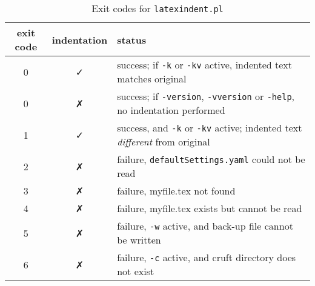  \begin{table}[!htb]
  \caption{Exit codes for \texttt{latexindent.pl}}
  \label{tab:exit-codes}
  \begin{tabular}{ccl}
   \toprule
   exit code & indentation & status                                                                                        \\
   \midrule
   0         & \faCheck    & success; if \texttt{-k} or \texttt{-kv} active, indented text matches original                \\
   0         & \faClose    & success; if \texttt{-version}, \texttt{-vversion} or \texttt{-help}, no indentation performed \\
   1         & \faCheck    & success, and \texttt{-k} or \texttt{-kv} active; indented text \emph{different} from original \\
   \midrule
   2         & \faClose    & failure, \texttt{defaultSettings.yaml} could not be read                                      \\
   3         & \faClose    & failure, myfile.tex not found                                                                 \\
   4         & \faClose    & failure, myfile.tex exists but cannot be read                                                 \\
   5         & \faClose    & failure, \texttt{-w} active, and back-up file cannot be written                               \\
   6         & \faClose    & failure, \texttt{-c} active, and cruft directory does not exist                               \\
   \bottomrule
  \end{tabular}
 \end{table}
